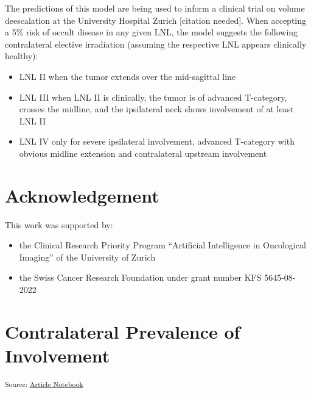\documentclass[
  sn-mathphys-num,
]{sn-jnl}
\providecommand{\tightlist}{%
  \setlength{\itemsep}{0pt}\setlength{\parskip}{0pt}}\usepackage{longtable,booktabs,array}
\begin{document}
The predictions of this model are being used to inform a clinical trial
on volume deescalation at the University Hospital Zurich {[}citation
needed{]}. When accepting a 5\% risk of occult disease in any given LNL,
the model suggests the following contralateral elective irradiation
(assuming the respective LNL appears clinically healthy):

\begin{itemize}
\tightlist
\item
  LNL II when the tumor extends over the mid-sagittal line
\item
  LNL III when LNL II is clinically, the tumor is of advanced
  T-category, crosses the midline, and the ipsilateral neck shows
  involvement of at least LNL II
\item
  LNL IV only for severe ipsilateral involvement, advanced T-category
  with obvious midline extension and contralateral upstream involvement
\end{itemize}

\section{Acknowledgement}\label{acknowledgement}

This work was supported by:

\begin{itemize}
\tightlist
\item
  the Clinical Research Priority Program ``Artificial Intelligence in
  Oncological Imaging'' of the University of Zurich
\item
  the Swiss Cancer Research Foundation under grant number KFS
  5645-08-2022
\end{itemize}

\section{Contralateral Prevalence of
Involvement}\label{contralateral-prevalence-of-involvement}

\textsubscript{Source:
\href{https://rmnldwg.github.io/bilateral-paper/manuscript-preview.html}{Article
Notebook}}
\end{document}
